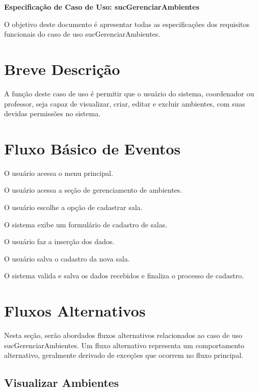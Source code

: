 \documentclass[12pt,a4paper]{article}
\newcommand{\ucnome}{sucGerenciarAmbientes}
\newcommand{\uctitulo}{Especificação de Caso de Uso: \ucnome}
\begin{document}

\begin{center}
  {\Large\bfseries \uctitulo}
\end{center}

\vspace{0.5\baselineskip}

O objetivo deste documento é apresentar todas as especificações dos requisitos
funcionais do caso de uso \ucnome.

\section{Breve Descrição}

A função deste caso de uso é permitir que o usuário do sistema, coordenador ou
professor, seja capaz de visualizar, criar, editar e excluir ambientes, com
suas devidas permissões no sistema.

\section{Fluxo Básico de Eventos}

\begin{fluxo}
  \item O usuário acessa o menu principal.
  \item O usuário acessa a seção de gerenciamento de ambientes.
  \item O usuário escolhe a opção de cadastrar sala.
  \item O sistema exibe um formulário de cadastro de salas.
  \item O usuário faz a inserção dos dados.
  \item O usuário salva o cadastro da nova sala.
  \item O sistema valida e salva os dados recebidos e finaliza o processo de
        cadastro.
\end{fluxo}

\section{Fluxos Alternativos}

Nesta seção, serão abordados fluxos alternativos relacionados ao caso de uso
\ucnome. Um fluxo alternativo representa um comportamento alternativo,
geralmente derivado de exceções que ocorrem no fluxo principal.

\subsection{Visualizar Ambientes}
\end{document}
